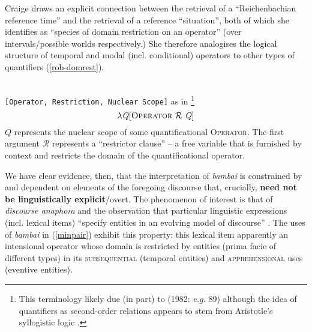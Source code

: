 {\centering{}}


\xe






 Craige \citet[663]{Roberts1995} draws an explicit connection between the retrieval of a ``Reichenbachian reference time'' and the retrieval of a reference ``situation'', both of which she identifies as ``species of domain restriction on an operator'' (over intervals/possible worlds respectively.) She therefore analogises the logical structure of temporal and modal (incl. conditional) operators to other types of quantifiers (\ref{rob-domrest}).
 
 \pex\label{rob-domrest}\\ \texttt{[Operator,~Restriction, Nuclear Scope]} as in \citet[665]{Roberts1995}\footnote{This terminology likely due (in part) to \citeauthor{Heim} (1982: \textit{e.g.} 89) although the idea of quantifiers as second-order relations appears to stem from Aristotle's syllogistic logic \citep[see][]{Westerstahl2019}.}
 	  $$ \lambda \mathit{Q}[\textsc{Operator}\ \mathcal R\ \mathit{Q}]$$
 	  $ \mathit{Q} $ represents the nuclear scope of some quantificational \textsc{Operator}. The first argument $ \mathcal R$ represents a ``restrictor clause'' -- a free variable that is furnished by context and restricts the domain of the quantificational operator.
\xe



We have clear evidence, then, that the interpretation of \textit{bambai} is constrained by and dependent on elements of the foregoing discourse that, crucially, \textbf{need not be linguistically explicit}/overt. The phenomenon of interest is that of \textit{discourse anaphora} and the observation that particular linguistic expressions (incl. lexical items) ``specify entities in an evolving model of discourse'' \citep[see][]{Webber1988}. The uses of \textit{bambai} in (\ref{minpair}) exhibit this property: this lexical item apparently an intensional operator whose domain is restricted by entities (prima facie of different types) in its \textsc{subsequential} (temporal entities) and \textsc{apprehensional} uses (eventive entities).


